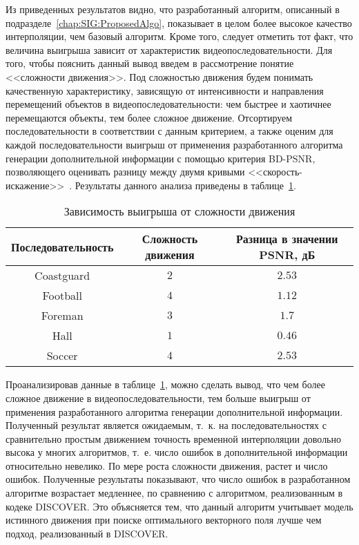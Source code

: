 Из приведенных результатов видно, что разработанный алгоритм, описанный в подразделе~\ref{chap:SIG:ProposedAlgo}, показывает в целом более высокое качество интерполяции, чем базовый алгоритм. Кроме того, следует  отметить тот факт, что величина выигрыша зависит от характеристик видеопоследовательности. Для того, чтобы пояснить данный вывод введем в рассмотрение понятие <<сложности движения>>. Под сложностью движения будем понимать качественную характеристику, зависящую от интенсивности и направления перемещений объектов в видеопоследовательности: чем быстрее и хаотичнее перемещаются объекты, тем более сложное движение. Отсортируем последовательности в соответствии с данным критерием, а также оценим для каждой последовательности выигрыш от применения разработанного алгоритма генерации дополнительной информации с помощью критерия BD-PSNR, позволяющего оценивать разницу между двумя кривыми <<скорость-искажение>>~\cite{Bjontegaard2001}. Результаты данного анализа приведены в таблице~\ref{tab:BDPSNRvsMotionComplexity}.

\begin{table}[H]
    \begin{center}
        \caption{Зависимость выигрыша от сложности движения}
        \label{tab:BDPSNRvsMotionComplexity}
        \begin{tabular}{|c|c|c|}
            \hline
            {\bfseries Последовательность } & {\bfseries Сложность движения} & {\bfseries Разница в значении PSNR, дБ} \\
            \hline
            Coastguard 	& $2$	& $2.53$ \\
            \hline
            Football	& $4$	& $1.12$ \\
            \hline
            Foreman 	& $3$ 	& $1.7$ \\
            \hline
            Hall		& $1$ 	& $0.46$ \\
            \hline
            Soccer 		& $4$ 	& $2.53$ \\
            \hline
        \end{tabular}
    \end{center}
\end{table}

Проанализировав данные в таблице~\ref{tab:BDPSNRvsMotionComplexity}, можно сделать вывод, что чем более сложное движение в видеопоследовательности, тем больше выигрыш от применения разработанного алгоритма генерации дополнительной информации. Полученный результат является ожидаемым, т.~к. на последовательностях с сравнительно простым движением точность временной интерполяции довольно высока у многих алгоритмов, т.~е. число ошибок в дополнительной информации относительно невелико. По мере роста сложности движения, растет и число ошибок. Полученные результаты показывают, что число ошибок в разработанном алгоритме возрастает медленнее, по сравнению с алгоритмом, реализованным в кодеке DISCOVER. Это объясняется тем, что данный алгоритм учитывает модель истинного движения при поиске оптимального векторного поля лучше чем подход, реализованный в DISCOVER.

